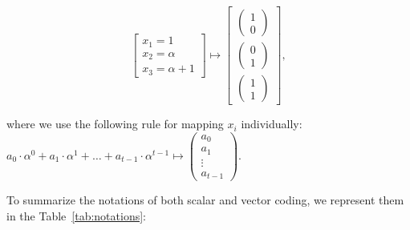 \[
\left[\begin{array}{c}
x_{1}=1\\
x_{2}=\alpha\\
x_{3}=\alpha+1
\end{array}\right]\mapsto\left[\begin{array}{c}
\left(\begin{array}{c}
1\\
0
\end{array}\right)\\
\left(\begin{array}{c}
0\\
1
\end{array}\right)\\
\left(\begin{array}{c}
1\\
1
\end{array}\right)
\end{array}\right],
\]

where we use the following rule for mapping $x_{i}$ individually:
$a_{0}\cdot\alpha^{0}+a_{1}\cdot\alpha^{1}+\ldots+a_{t-1}\cdot\alpha^{t-1}\mapsto\left(\begin{array}{c}
a_{0}\\
a_{1}\\
\vdots\\
a_{t-1}
\end{array}\right)$.

To summarize the notations of both scalar and vector coding, we represent
them in the Table~\ref{tab:notations}:

